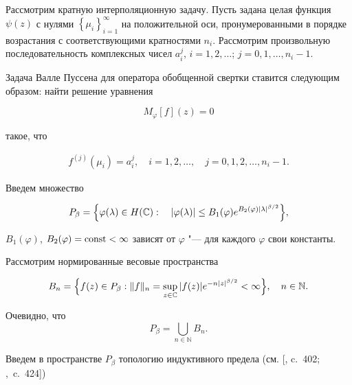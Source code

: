 Рассмотрим кратную интерполяционную задачу. Пусть задана целая \linebreak функция $\psi(z)$ с нулями $\left\{\mu_i\right\}_{i=1}^\infty$  на положительной оси, пронумерованными в порядке возрастания с соответствующими кратностями $n_i$. Рассмотрим произвольную последовательность комплексных чисел $a^j_i$, $i = 1, 2, \ldots$; \linebreak $j = 0, 1, \ldots, n_i-1.$



Задача Валле Пуссена для оператора обобщенной свертки ставится следующим образом: найти решение уравнения

$$

M_\varphi[f](z) = 0

$$

такое, что

\begin{eqnarray*}

    f^{(j)}(\mu_i) = a^{j}_i, \quad i = 1, 2, \ldots, \quad j = 0, 1, 2, \ldots, n_{i}-1 .

\end{eqnarray*}



\smallskip




Введем множество

$$

P_\beta=\Bigl\{\varphi(\lambda)\in H(\mathbb{C}): \quad \left|\varphi(\lambda)\right|\leq B_1(\varphi) e^{B_2(\varphi) \left|\lambda\right|^{{\beta}/{2}}} \Bigr\},

$$

$B_1(\varphi)$, $B_2(\varphi)={\rm const}<\infty$ зависят от $\varphi$ "--- для каждого $\varphi$ свои константы.



Рассмотрим нормированные весовые пространства

$$

B_{n}=\Bigl\{ f(z)\in P_\beta: \|f\|_{n}=\sup \limits_{z \in \mathbb{C}} |f(z)|e^{- n |z|^{{\beta}/{2}}} <\infty \Bigr\}, \quad n \in \mathbb{N}.

$$



Очевидно, что $$P_\beta=\bigcup\limits_{n\in\mathbb{N}}B_n.$$ 

Введем в пространстве $P_\beta$ топологию индуктивного предела  (см. [, c.~402;  \mbox{, c.~424}])

